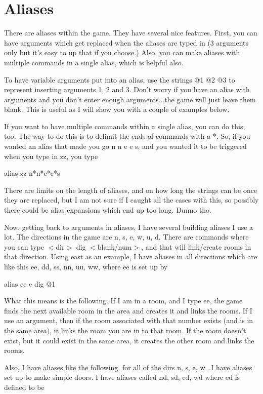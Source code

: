 \section{Aliases}

There are aliases within the game. They have several nice
features. First, you can have arguments which get replaced when the
aliases are typed in (3 arguments only but it's easy to up that if you
choose.) Also, you can make aliases with multiple commands in a single
alias, which is helpful also.

To have variable arguments put into an alias, use the strings @1 @2 @3
to represent inserting arguments 1, 2 and 3. Don't worry if you have
an alias with arguments and you don't enter enough arguments...the
game will just leave them blank. This is useful as I will show you
with a couple of examples below.

If you want to have multiple commands within a single alias, you can
do this, too. The way to do this is to delimit the ends of commands
with a *. So, if you wanted an alias that made you go n n e e s, and
you wanted it to be triggered when you type in zz, you type

alias zz n*n*e*e*s

There are limits on the length of aliases, and on how long the strings
can be once they are replaced, but I am not sure if I caught all the
cases with this, so possibly there could be alias expansions which end
up too long. Dunno tho. 

Now, getting back to arguments in aliases, I have several building
aliases I use a lot. The directions in the game are n, s, e, w, u,
d. There are commands where you can type $<$dir$>$ dig
$<$blank/num$>$, and that will link/create rooms in that
direction. Using east as an example, I have aliases in all directions
which are like this ee, dd, ss, nn, uu, ww, where ee is set up by

alias ee e dig @1

What this means is the following. If I am in a room, and I type ee,
the game finds the next available room in the area and creates it and
links the rooms. If I use an argument, then if the room associated
with that number exists (and is in the same area), it links the room
you are in to that room. If the room doesn't exist, but it could exist
in the same area, it creates the other room and links the rooms.

Also, I have aliases like the following, for all of the dirs n, s, e,
w...I have aliases set up to make simple doors. I have aliases called
nd, sd, ed, wd where ed is defined to be

